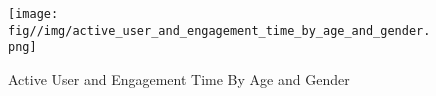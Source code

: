 \begin{figure}
    \centering
    \texttt{[image: fig//img/active\_user\_and\_engagement\_time\_by\_age\_and\_gender.png]}
    \caption{Active User and Engagement Time By Age and Gender}
    \label{fig:active_user_and_engagement_time_by_age_and_gender}
\end{figure}
